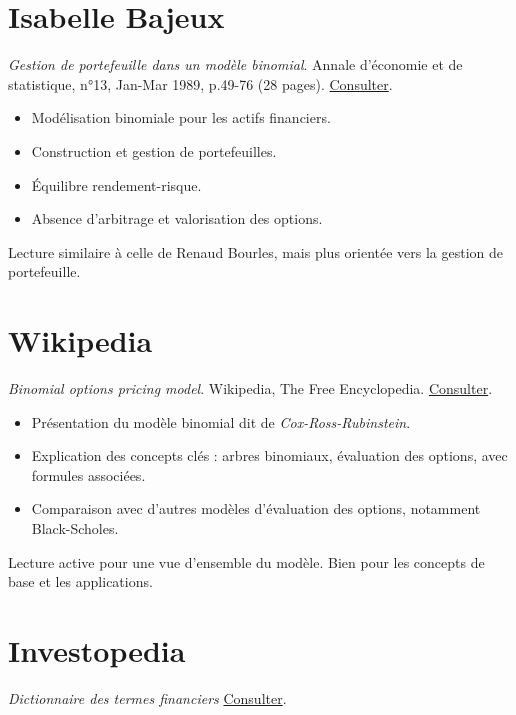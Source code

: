 \documentclass[a4paper,10pt]{article}
\begin{document}
\section*{Isabelle Bajeux}
{}
\textit{Gestion de portefeuille dans un modèle binomial}. Annale d'économie et de statistique, n°13, Jan-Mar 1989, p.49-76 (28 pages). \href{https://www.jstor.org/stable/20075729}{Consulter}.
\begin{itemize}
    \item Modélisation binomiale pour les actifs financiers.
    \item Construction et gestion de portefeuilles.
    \item Équilibre rendement-risque.
    \item Absence d’arbitrage et valorisation des options.
\end{itemize}
Lecture similaire à celle de Renaud Bourles, mais plus orientée vers la gestion de portefeuille.\\

\vspace{1em}

\section*{Wikipedia}
{}
\textit{Binomial options pricing model}. Wikipedia, The Free Encyclopedia. \href{https://en.wikipedia.org/wiki/Binomial_options_pricing_model?oldid=215677262}{Consulter}.
\begin{itemize}
    \item Présentation du modèle binomial dit de \textit{Cox-Ross-Rubinstein}.
    \item Explication des concepts clés : arbres binomiaux, évaluation des options, avec formules associées.
    \item Comparaison avec d'autres modèles d'évaluation des options, notamment Black-Scholes.
\end{itemize}
Lecture active pour une vue d'ensemble du modèle. Bien pour les concepts de base et les applications.\\

\vspace{1em}

\section*{Investopedia}
{}
\textit{Dictionnaire des termes financiers} \href{https://www.investopedia.com/financial-term-dictionary-4769738}{Consulter}.
\end{document}
